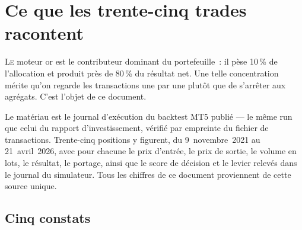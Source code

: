 \section{Ce que les trente-cinq trades racontent}

\lettrine{L}{e} moteur or est le contributeur dominant du portefeuille~: il pèse
10\,\% de l'allocation et produit près de 80\,\% du résultat net. Une telle
concentration mérite qu'on regarde les transactions une par une plutôt que de
s'arrêter aux agrégats. C'est l'objet de ce document.

Le matériau est le journal d'exécution du backtest MT5 publié --- le même run
que celui du rapport d'investissement, vérifié par empreinte du fichier de
transactions. Trente-cinq positions y figurent, du 9~novembre~2021 au
21~avril~2026, avec pour chacune le prix d'entrée, le prix de sortie, le volume
en lots, le résultat, le portage, ainsi que le score de décision et le levier
relevés dans le journal du simulateur. Tous les chiffres de ce document
proviennent de cette source unique.

\subsection*{Cinq constats}


